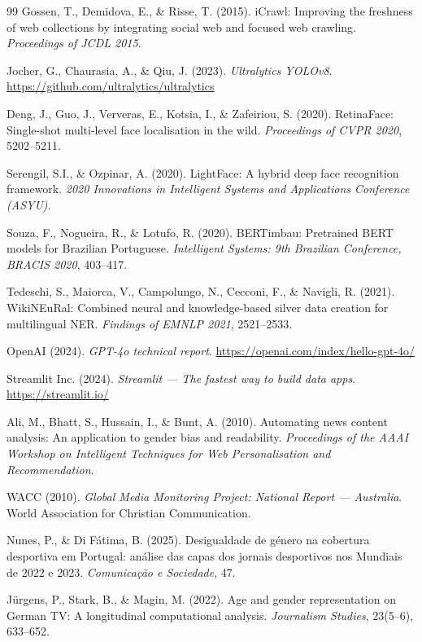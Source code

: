 \documentclass[11pt,a4paper]{article}
\begin{document}
\begin{thebibliography}{99}
Gossen, T., Demidova, E., \& Risse, T. (2015).
iCrawl: Improving the freshness of web collections by integrating social web and focused web crawling.
\textit{Proceedings of JCDL 2015}.

Jocher, G., Chaurasia, A., \& Qiu, J. (2023).
\textit{Ultralytics YOLOv8}.
\url{https://github.com/ultralytics/ultralytics}

Deng, J., Guo, J., Ververas, E., Kotsia, I., \& Zafeiriou, S. (2020).
RetinaFace: Single-shot multi-level face localisation in the wild.
\textit{Proceedings of CVPR 2020}, 5202–5211.

Serengil, S.I., \& Ozpinar, A. (2020).
LightFace: A hybrid deep face recognition framework.
\textit{2020 Innovations in Intelligent Systems and Applications Conference (ASYU)}.

Souza, F., Nogueira, R., \& Lotufo, R. (2020).
BERTimbau: Pretrained BERT models for Brazilian Portuguese.
\textit{Intelligent Systems: 9th Brazilian Conference, BRACIS 2020}, 403–417.

Tedeschi, S., Maiorca, V., Campolungo, N., Cecconi, F., \& Navigli, R. (2021).
WikiNEuRal: Combined neural and knowledge-based silver data creation for multilingual NER.
\textit{Findings of EMNLP 2021}, 2521–2533.

OpenAI (2024).
\textit{GPT-4o technical report}.
\url{https://openai.com/index/hello-gpt-4o/}


Streamlit Inc. (2024).
\textit{Streamlit — The fastest way to build data apps}.
\url{https://streamlit.io/}

Ali, M., Bhatt, S., Hussain, I., \& Bunt, A. (2010).
Automating news content analysis: An application to gender bias and readability.
\textit{Proceedings of the AAAI Workshop on Intelligent Techniques for Web Personalisation and Recommendation}.

WACC (2010).
\textit{Global Media Monitoring Project: National Report — Australia}.
World Association for Christian Communication.

Nunes, P., \& Di Fátima, B. (2025).
Desigualdade de género na cobertura desportiva em Portugal: análise das capas dos jornais desportivos nos Mundiais de 2022 e 2023.
\textit{Comunicação e Sociedade}, 47.

Jürgens, P., Stark, B., \& Magin, M. (2022).
Age and gender representation on German TV: A longitudinal computational analysis.
\textit{Journalism Studies}, 23(5–6), 633–652.


\end{thebibliography}
\end{document}
